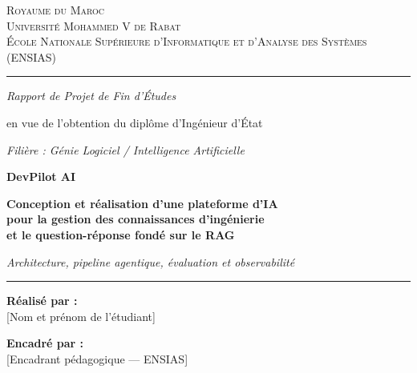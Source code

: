 \documentclass[12pt,a4paper,oneside]{report}
\begin{document}

\begin{titlepage}
\centering
\thispagestyle{empty}
{\small\scshape Royaume du Maroc \\ Université Mohammed V de Rabat \\
École Nationale Supérieure d'Informatique et d'Analyse des Systèmes (ENSIAS)\par}
\vspace{0.8cm}
{\color{lineGray}\rule{\textwidth}{0.5pt}}
\vspace{1.2cm}

{\small\itshape Rapport de Projet de Fin d'Études\par}
\vspace{0.4cm}
{\small en vue de l'obtention du diplôme d'Ingénieur d'État\par}
\vspace{0.2cm}
{\small\textit{Filière : Génie Logiciel / Intelligence Artificielle}\par}

\vspace{1.6cm}
{\color{brand}\Huge\bfseries DevPilot AI\par}
\vspace{0.6cm}
{\LARGE\bfseries Conception et réalisation d'une plateforme d'IA\\[4pt]
pour la gestion des connaissances d'ingénierie\\[4pt]
et le question-réponse fondé sur le RAG\par}
\vspace{0.5cm}
{\large\itshape Architecture, pipeline agentique, évaluation et observabilité\par}

\vspace{1.8cm}
{\color{lineGray}\rule{0.6\textwidth}{0.5pt}}
\vspace{0.6cm}

\begin{minipage}{0.46\textwidth}
\begin{flushleft}\large
\textbf{Réalisé par :}\\[2pt]
[Nom et prénom de l'étudiant]
\end{flushleft}
\end{minipage}\hfill
\begin{minipage}{0.46\textwidth}
\begin{flushright}\large
\textbf{Encadré par :}\\[2pt]
[Encadrant pédagogique — ENSIAS]\\
[Encadrant professionnel — Organisme]
\end{flushright}
\end{minipage}


\end{titlepage}
\end{document}
